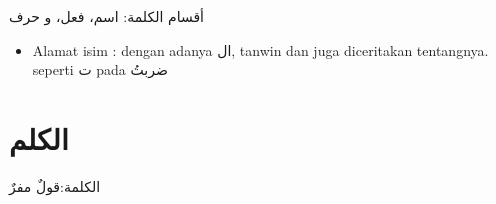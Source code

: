 \documentclass[
]{book}
\providecommand{\tightlist}{%
  \setlength{\itemsep}{0pt}\setlength{\parskip}{0pt}}
\begin{document}
أقسام الكلمة: اسم، فعل، و حرف

\begin{itemize}
\tightlist
\item
  Alamat isim : dengan adanya ال, tanwin dan juga diceritakan tentangnya. seperti ت pada ضربتُ
\end{itemize}

\hypertarget{ux627ux644ux643ux644ux645}{%
\chapter{الكلم}\label{ux627ux644ux643ux644ux645}}

الكلمة:قولٌ مفرٌ

  
\end{document}
